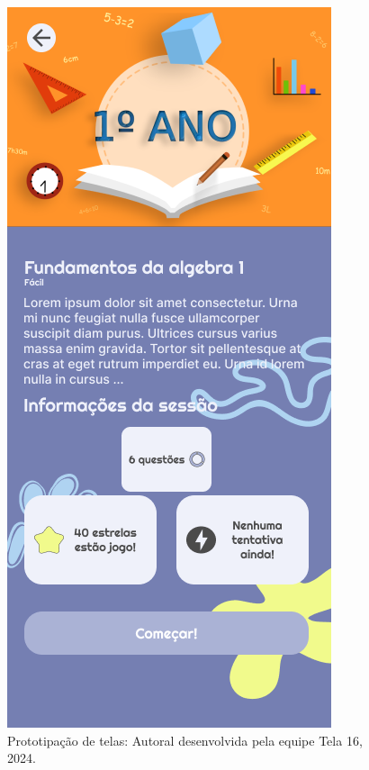 \documentclass[12pt, openany, oneside, a4paper, english, brazil]{abntex2}   %
\begin{document}
\begin{figure}
    \centering
    \includegraphics[scale=0.7]{figuras/Math.Pow App/Seassion_Page.png}
    \caption{Prototipação de telas: Autoral desenvolvida pela equipe Tela 16, 2024.}
    \label{fig:nome-da-imagem}
\end{figure}
\end{document}
